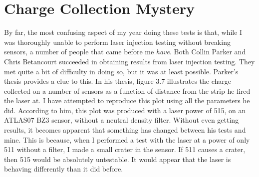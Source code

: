 \documentclass{report}
\begin{document}
        \section{Charge Collection Mystery}
            By far, the most confusing aspect of my year doing these tests is that, while I was thoroughly unable to perform laser injection testing without breaking sensors, a number of people that came before me \textit{have}. Both Collin Parker and Chris Betancourt succeeded in obtaining results from laser injection testing. They met quite a bit of difficulty in doing so, but it was at least possible. Parker's thesis provides a clue to this. In his thesis, figure 3.7 illustrates the charge collected on a number of sensors as a function of distance from the strip he fired the laser at. I have attempted to reproduce this plot using all the parameters he did. According to him, this plot was produced with a laser power of 515, on an ATLAS07 BZ3 sensor, without a neutral density filter. Without even getting results, it becomes apparent that something has changed between his tests and mine. This is because, when I performed a test with the laser at a power of only 511 without a filter, I made a small crater in the sensor. If 511 causes a crater, then 515 would be absolutely untestable. It would appear that the laser is behaving differently than it did before.
            
\end{document}
